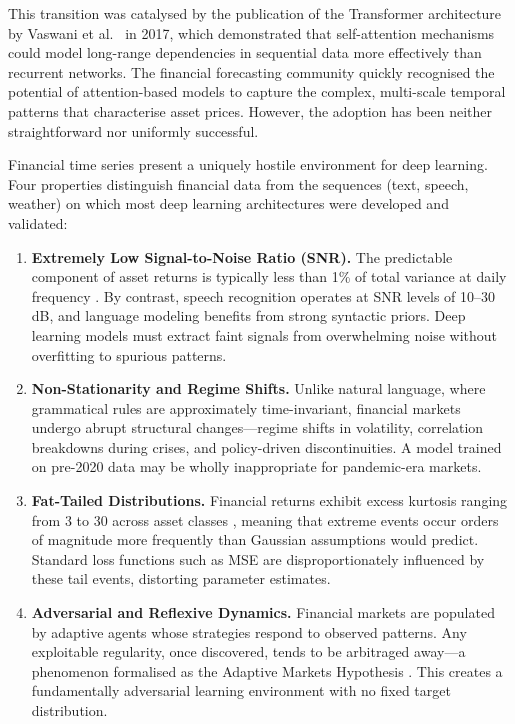 \documentclass[conference]{IEEEtran}
\begin{document}
This transition was catalysed by the publication of the Transformer architecture by Vaswani et al.\ \cite{vaswani2017attention} in 2017, which demonstrated that self-attention mechanisms could model long-range dependencies in sequential data more effectively than recurrent networks. The financial forecasting community quickly recognised the potential of attention-based models to capture the complex, multi-scale temporal patterns that characterise asset prices. However, the adoption has been neither straightforward nor uniformly successful.

Financial time series present a uniquely hostile environment for deep learning. Four properties distinguish financial data from the sequences (text, speech, weather) on which most deep learning architectures were developed and validated:

\begin{enumerate}[nosep]
    \item \textbf{Extremely Low Signal-to-Noise Ratio (SNR).} The predictable component of asset returns is typically less than 1\% of total variance at daily frequency \cite{gu2020empirical}. By contrast, speech recognition operates at SNR levels of 10--30 dB, and language modeling benefits from strong syntactic priors. Deep learning models must extract faint signals from overwhelming noise without overfitting to spurious patterns.

    \item \textbf{Non-Stationarity and Regime Shifts.} Unlike natural language, where grammatical rules are approximately time-invariant, financial markets undergo abrupt structural changes---regime shifts in volatility, correlation breakdowns during crises, and policy-driven discontinuities. A model trained on pre-2020 data may be wholly inappropriate for pandemic-era markets.

    \item \textbf{Fat-Tailed Distributions.} Financial returns exhibit excess kurtosis ranging from 3 to 30 across asset classes \cite{cont2001empirical}, meaning that extreme events occur orders of magnitude more frequently than Gaussian assumptions would predict. Standard loss functions such as MSE are disproportionately influenced by these tail events, distorting parameter estimates.

    \item \textbf{Adversarial and Reflexive Dynamics.} Financial markets are populated by adaptive agents whose strategies respond to observed patterns. Any exploitable regularity, once discovered, tends to be arbitraged away---a phenomenon formalised as the Adaptive Markets Hypothesis \cite{lo2004adaptive}. This creates a fundamentally adversarial learning environment with no fixed target distribution.
\end{enumerate}
\end{document}
